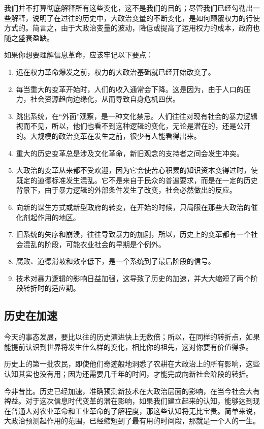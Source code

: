 我们并不打算彻底解释所有这些变化，这不是我们的目的；尽管我们已经勾勒出一些解释，说明了在过往的历史中，大政治变量的不断变化，是如何颠覆权力的行使方式的。简言之，由于大政治变量的波动，降低或提高了运用权力的成本，政府也随之盛衰盈缺。

如果你想要理解信息革命，应该牢记以下要点：

\begin{enumerate}
    \item 远在权力革命爆发之前，权力的大政治基础就已经开始改变了。
    \item 每当重大的变革开始时，人们的收入通常会下降。这是因为，由于人口的压力，社会资源趋向边缘化，从而导致自身危机四伏。
    \item 跳出系统，在“外面”观察，是一种文化禁忌。人们往往对现有社会的暴力逻辑视而不见，所以，他们也看不到这种逻辑的变化，无论是潜在的，还是公开的。大规模的政治变革在发生之前，很少有人能看得出来。
    \item 重大的历史变革总是涉及文化革命，新旧观念的支持者之间会发生冲突。
    \item 大政治的变革从来都不受欢迎，因为它会使苦心积累的知识资本变得过时，使既定的道德标准发生混乱。它不是来自于民众的普遍要求，而是在一定的历史背景下，由于暴力逻辑的外部条件发生了改变，社会必然做出的反应。
    \item 向新的谋生方式或新型政府的转变，在开始的时候，只局限在那些大政治的催化剂起作用的地区。
    \item 旧系统的失序和崩溃，往往导致暴力的加剧，所以，历史上的变革都有一个社会混乱的阶段，可能农业社会的早期是个例外。
    \item 腐败、道德滑坡和效率低下，是一个系统到了最后阶段的信号。
    \item 技术对暴力逻辑的影响日益加强，这导致了历史的加速，并大大缩短了两个阶段转折时的适应期。
\end{enumerate}


\subsection{历史在加速}
今天的事态发展，要比以往的历史演进快上无数倍；所以，在同样的转折点，如果能提前认识到世界将发生什么样的变化，相比你的祖先，这对你要有价值得多。

历史上的第一批农民，即使他们奇迹般地洞悉了农耕在大政治上的所有影响，这些认知其实也没有用；因为还需要几千年的时间，才能完成向新社会阶段的转折。

今非昔比。历史已经加速，准确预测新技术在大政治层面的影响，在当今社会大有裨益。对于这次信息时代变革的潜在影响，如果我们建立起来的认知，能够达到现在普通人对农业革命和工业革命的了解程度，那这些认知将无比宝贵。简单来说，大政治预测起作用的范围，已经缩短到了最有用的时间段，那就是一个人的一生。


